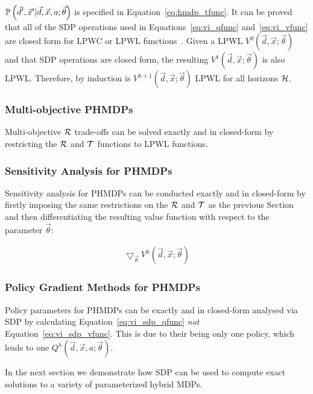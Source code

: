 {\footnotesize $\mathbb{P}\left({\vec{d}', \vec{x}' | \vec{d}, \vec{x}, a; \vec{\theta}}\right)$ } is specified in Equation~\eqref{eq:hmdp_tfunc}. It can be proved that all of the SDP operations used in Equations~\eqref{eq:vi_qfunc} and~\eqref{eq:vi_vfunc} are closed form for LPWC or LPWL functions~\parencite{Sanner_UAI_2011,Zamani_AAAI_2012}. Given a LPWL {\footnotesize $V^{0}(\vec{d}, \vec{x}; \vec{\theta})$} and that SDP operations are closed form, the resulting {\footnotesize $V^{1}(\vec{d}, \vec{x}; \vec{\theta})$} is also LPWL. Therefore, by induction is {\footnotesize $V^{h+1}(\vec{d}, \vec{x}; \vec{\theta})$} LPWL for all horizons {\footnotesize $ \mathcal{H} $}.

\subsubsection{Multi-objective PHMDPs}

Multi-objective {\footnotesize $\mathcal{R}$} trade-offs can be solved exactly and in closed-form by restricting the {\footnotesize $\mathcal{R}$} and {\footnotesize $\mathcal{T}$} functions to LPWL functions.

\subsubsection{Sensitivity Analysis for PHMDPs}

Sensitivity analysis for PHMDPs can be conducted exactly and in closed-form by firstly imposing the same restrictions on the {\footnotesize $\mathcal{R}$} and {\footnotesize $\mathcal{T}$} as the previous Section and then differentiating the resulting value function with respect to the parameter {\footnotesize $\vec{\theta}$}: 

{\footnotesize
    \abovedisplayskip=0pt
    \belowdisplayskip=0pt    
    \begin{align*}
        \bigtriangledown_{\vec{\theta}} V^{h}\left(\vec{d}, \vec{x}; \vec{\theta}\right)
    \end{align*}
}%

\subsubsection{Policy Gradient Methods for PHMDPs}

Policy parameters for PHMDPs can be exactly and in closed-form analysed via SDP by calculating Equation~\eqref{eq:vi_sdp_qfunc} \textit{not} Equation~\eqref{eq:vi_sdp_vfunc}. This is due to their being only one policy, which leads to one {\footnotesize $ Q^{h}(\vec{d}, \vec{x}, a; \vec{\theta}) $}.

In the next section we demonstrate how SDP can be used to compute exact solutions to a variety of parameterized hybrid MDPs.